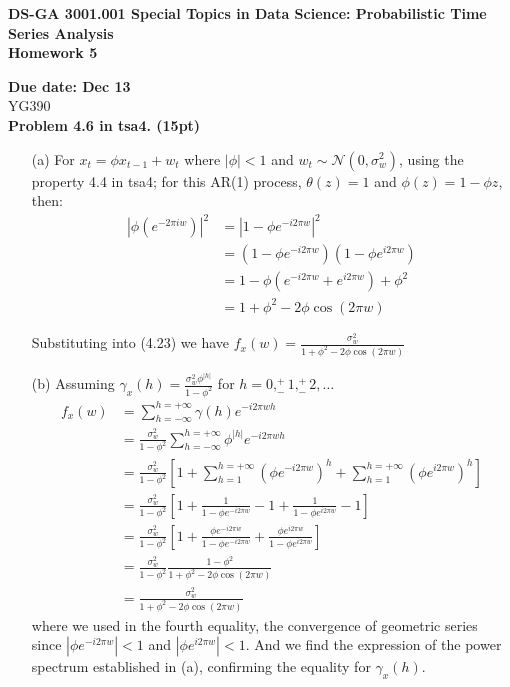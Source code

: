 \documentclass[12pt]{article}
\begin{document}
\thispagestyle{empty}
\begin{center}

\textbf{DS-GA 3001.001 Special Topics in Data Science: Probabilistic Time Series Analysis\\
Homework 5}
\end{center}

\noindent \textbf{Due date: Dec  13}\\
\noindent YG390\\


\noindent \textbf{Problem 4.6 in tsa4. (15pt)} 

\begin{itemize}
\item[(a)]
For $x_t = \phi x_{t-1} + w_t$ where $|\phi|<1$ and $w_t \sim \mathcal{N}(0,\sigma_w^2)$, using the property 4.4 in tsa4; for this AR(1) process, $\theta(z)=1$ and $\phi(z)=1- \phi z$,
then:
\begin{align*}
	|\phi(e^{-2 \pi i w})|^2		&=	|1 - \phi e^{-i 2 \pi w} | ^2  \\
						&= 	(1-\phi e^{-i 2 \pi w} ) (1-\phi e^{i 2 \pi w} ) \\
						&= 1 - \phi (e^{-i 2 \pi w} + e^{i 2 \pi w} ) + \phi^2 \\
						&= 1 +  \phi^2 -2 \phi \cos(2 \pi w)
\end{align*}

Substituting into (4.23) we have $f_x(w) = \frac{\sigma_w^2} {1 +  \phi^2 -2 \phi \cos(2 \pi w)}$

\item[(b)] Assuming $\gamma_x(h) = \frac{\sigma_w^2 \phi^{|h|}} {1-\phi^2}$ for $h = 0, _{-}^{+}1, _{-}^{+}2,\dots$
\begin{align*}
	f_x(w)	&=		\sum_{h=-\infty}^{h=+\infty} \gamma(h) e^{-i 2 \pi w h} \\
			&=		\frac{\sigma_w^2}  {1-\phi^2} \sum_{h=-\infty}^{h=+\infty} \phi^{|h|} e^{-i 2 \pi w h} \\
			&= 		\frac{\sigma_w^2}  {1-\phi^2} [1 + \sum_{h=1}^{h=+\infty}  (\phi e^{-i 2 \pi w})^h +  \sum_{h=1}^{h=+\infty}  (\phi e^{i 2 \pi w})^h ] \\
			&= 		\frac{\sigma_w^2}  {1-\phi^2} [1 + \frac{1} {1 - \phi e^{-i 2 \pi w}} - 1 +  \frac{1} {1 - \phi e^{i 2 \pi w}} - 1 ] \\
			&=		\frac{\sigma_w^2}  {1-\phi^2} [1 + \frac{\phi e^{-i 2 \pi w}}  {1 - \phi e^{-i 2 \pi w}} + \frac{\phi e^{i 2 \pi w}}  {1 - \phi e^{i 2 \pi w}}] \\
			&= 		\frac{\sigma_w^2}  {1-\phi^2} \frac{1-\phi^2} {1 +  \phi^2 -2 \phi \cos(2 \pi w)} \\
			&= 		\frac{\sigma_w^2} {1 +  \phi^2 -2 \phi \cos(2 \pi w)}
\end{align*}
where we used in the fourth equality, the convergence of geometric series since $|\phi  e^{-i 2 \pi w}| <1$ and  $|\phi  e^{i 2 \pi w}| <1$.
And we find the expression of the power spectrum established in (a), confirming the equality for $\gamma_x(h)$.

\end{itemize}
\end{document}

